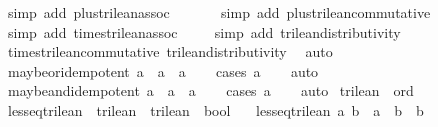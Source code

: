 \begin{isabellebody}
\ {\isacharparenleft}simp\ add{\isacharcolon}\ plus{\isacharunderscore}trilean{\isacharunderscore}assoc{\isacharparenright}\isanewline
\ \ \ \ \ \isamarkupfalse%
\ {\isacharparenleft}simp\ add{\isacharcolon}\ plus{\isacharunderscore}trilean{\isacharunderscore}commutative{\isacharparenright}\isanewline
\ \ \ \ \isamarkupfalse%
\ {\isacharparenleft}simp\ add{\isacharcolon}\ times{\isacharunderscore}trilean{\isacharunderscore}assoc{\isacharparenright}\isanewline
\ \ \ \isamarkupfalse%
\ {\isacharparenleft}simp\ add{\isacharcolon}\ trilean{\isacharunderscore}distributivity{\isacharunderscore}{}{\isacharparenright}\isanewline
\ \ \isamarkupfalse%
\ times{\isacharunderscore}trilean{\isacharunderscore}commutative\ trilean{\isacharunderscore}distributivity{\isacharunderscore}{}\ \isamarkupfalse%
\ auto%
\endisatagproof
{\isafoldproof}%
%
\isadelimproof
\isanewline
%
\endisadelimproof
{}\isamarkupfalse%
\isanewline
\isanewline
{}\isamarkupfalse%
\ maybe{\isacharunderscore}or{\isacharunderscore}idempotent{\isacharcolon}\ {\isachardoublequoteopen}a\ {\isasymor}\isactrlsub {\isacharquery}\ a\ {\isacharequal}\ a{\isachardoublequoteclose}\isanewline
%
\isadelimproof
\ \ %
\endisadelimproof
%
\isatagproof
{}\isamarkupfalse%
\ {\isacharparenleft}cases\ a{\isacharparenright}\isanewline
\ \ \isamarkupfalse%
\ auto%
\endisatagproof
{\isafoldproof}%
%
\isadelimproof
\isanewline
%
\endisadelimproof
\isanewline
{}\isamarkupfalse%
\ maybe{\isacharunderscore}and{\isacharunderscore}idempotent{\isacharcolon}\ {\isachardoublequoteopen}a\ {\isasymand}\isactrlsub {\isacharquery}\ a\ {\isacharequal}\ a{\isachardoublequoteclose}\isanewline
%
\isadelimproof
\ \ %
\endisadelimproof
%
\isatagproof
{}\isamarkupfalse%
\ {\isacharparenleft}cases\ a{\isacharparenright}\isanewline
\ \ \isamarkupfalse%
\ auto%
\endisatagproof
{\isafoldproof}%
%
\isadelimproof
\isanewline
%
\endisadelimproof
\isanewline
{}\isamarkupfalse%
\ trilean\ {\isacharcolon}{\isacharcolon}\ ord\ \isanewline
{}\isamarkupfalse%
\ less{\isacharunderscore}eq{\isacharunderscore}trilean\ {\isacharcolon}{\isacharcolon}\ {\isachardoublequoteopen}trilean\ {\isasymRightarrow}\ trilean\ {\isasymRightarrow}\ bool{\isachardoublequoteclose}\ \isanewline
\ \ {\isachardoublequoteopen}less{\isacharunderscore}eq{\isacharunderscore}trilean\ a\ b\ {\isacharequal}\ {\isacharparenleft}a\ {\isacharplus}\ b\ {\isacharequal}\ b{\isacharparenright}{\isachardoublequoteclose}\isanewline

\end{isabellebody}

